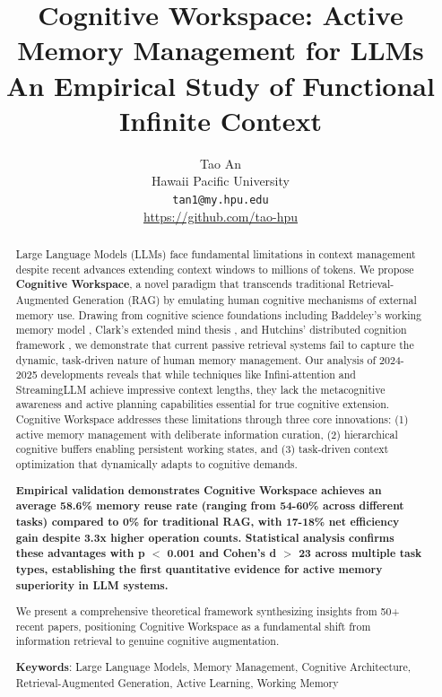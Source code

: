 \documentclass[10pt,twocolumn]{article}
\title{Cognitive Workspace: Active Memory Management for LLMs\\An Empirical Study of Functional Infinite Context}
\author{
Tao An \\
Hawaii Pacific University \\
\texttt{tan1@my.hpu.edu} \\
\url{https://github.com/tao-hpu}
}
\date{}
\begin{document}
\maketitle

\begin{abstract}
Large Language Models (LLMs) face fundamental limitations in context management despite recent advances extending context windows to millions of tokens. We propose \textbf{Cognitive Workspace}, a novel paradigm that transcends traditional Retrieval-Augmented Generation (RAG) by emulating human cognitive mechanisms of external memory use. Drawing from cognitive science foundations including Baddeley's working memory model \cite{baddeley2000episodic, baddeley2012working}, Clark's extended mind thesis \cite{clark1998extended}, and Hutchins' distributed cognition framework \cite{hutchins1995cognition}, we demonstrate that current passive retrieval systems fail to capture the dynamic, task-driven nature of human memory management. Our analysis of 2024-2025 developments reveals that while techniques like Infini-attention \cite{munkhdalai2024leave} and StreamingLLM \cite{xiao2024efficient} achieve impressive context lengths, they lack the metacognitive awareness and active planning capabilities essential for true cognitive extension. Cognitive Workspace addresses these limitations through three core innovations: (1) active memory management with deliberate information curation, (2) hierarchical cognitive buffers enabling persistent working states, and (3) task-driven context optimization that dynamically adapts to cognitive demands. 

\textbf{Empirical validation demonstrates Cognitive Workspace achieves an average 58.6\% memory reuse rate (ranging from 54-60\% across different tasks) compared to 0\% for traditional RAG, with 17-18\% net efficiency gain despite 3.3x higher operation counts. Statistical analysis confirms these advantages with p $<$ 0.001 and Cohen's d $>$ 23 across multiple task types, establishing the first quantitative evidence for active memory superiority in LLM systems.} 

We present a comprehensive theoretical framework synthesizing insights from 50+ recent papers, positioning Cognitive Workspace as a fundamental shift from information retrieval to genuine cognitive augmentation.

\textbf{Keywords}: Large Language Models, Memory Management, Cognitive Architecture, Retrieval-Augmented Generation, Active Learning, Working Memory
\end{abstract}
\end{document}
